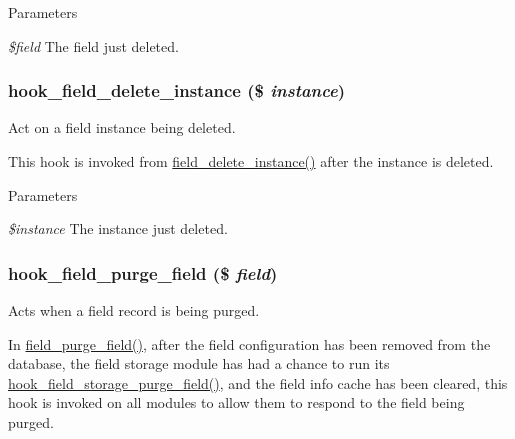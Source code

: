 \begin{DoxyParams}{Parameters}
\item[{\em \$field}]The field just deleted. \end{DoxyParams}
\hypertarget{group__field__crud_gae351ac9408b7c2e8bfefd9ebca5ab7f5}{
\subsubsection[{hook\_\-field\_\-delete\_\-instance}]{\setlength{\rightskip}{0pt plus 5cm}hook\_\-field\_\-delete\_\-instance (\$ {\em instance})}}
\label{group__field__crud_gae351ac9408b7c2e8bfefd9ebca5ab7f5}
Act on a field instance being deleted.

This hook is invoked from \hyperlink{group__field__crud_ga16bf0e2a15b20b066ff84403b5f24bf5}{field\_\-delete\_\-instance()} after the instance is deleted.


\begin{DoxyParams}{Parameters}
\item[{\em \$instance}]The instance just deleted. \end{DoxyParams}
\hypertarget{group__field__crud_ga3ffd215689e7cb41bcf9b79f8a65eab0}{
\subsubsection[{hook\_\-field\_\-purge\_\-field}]{\setlength{\rightskip}{0pt plus 5cm}hook\_\-field\_\-purge\_\-field (\$ {\em field})}}
\label{group__field__crud_ga3ffd215689e7cb41bcf9b79f8a65eab0}
Acts when a field record is being purged.

In \hyperlink{group__field__purge_gac52122a65da997921f3a6a8f45deddbf}{field\_\-purge\_\-field()}, after the field configuration has been removed from the database, the field storage module has had a chance to run its \hyperlink{group__field__crud_gaf58b7071fdeee08fb4edadc127eecd5d}{hook\_\-field\_\-storage\_\-purge\_\-field()}, and the field info cache has been cleared, this hook is invoked on all modules to allow them to respond to the field being purged.


